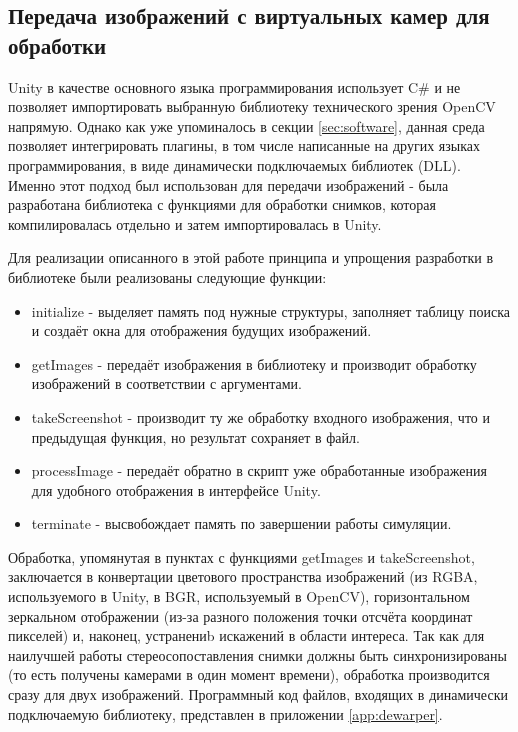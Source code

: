 \subsection{Передача изображений с виртуальных камер для обработки}

Unity в качестве основного языка программирования использует C\# и не позволяет импортировать 
выбранную библиотеку технического зрения OpenCV напрямую. Однако как уже упоминалось в секции 
\ref{sec:software}, данная среда позволяет интегрировать плагины, в том числе написанные на 
других языках программирования, в виде динамически подключаемых библиотек (DLL). Именно этот 
подход был использован для передачи изображений - была разработана библиотека с функциями для 
обработки снимков, которая компилировалась отдельно и затем импортировалась в Unity. 

Для реализации описанного в этой работе принципа и упрощения разработки в библиотеке были реализованы 
следующие функции:
\begin{itemize}
    \item initialize - выделяет память под нужные структуры, заполняет таблицу поиска и создаёт окна 
    для отображения будущих изображений.
    \item getImages - передаёт изображения в библиотеку и производит обработку изображений в 
    соответствии с аргументами. 
    \item takeScreenshot - производит ту же обработку входного изображения, что и предыдущая функция,
     но результат сохраняет в файл. 
    \item processImage - передаёт обратно в скрипт уже обработанные изображения для удобного отображения
    в интерфейсе Unity. 
    \item terminate - высвобождает память по завершении работы симуляции.      
\end{itemize}

Обработка, упомянутая в пунктах с функциями getImages и takeScreenshot, заключается в конвертации 
цветового пространства изображений (из RGBA, используемого в Unity, в BGR, используемый в OpenCV), 
горизонтальном зеркальном отображении (из-за разного положения точки отсчёта координат пикселей)
и, наконец, устранениb искажений в области интереса. Так как для наилучшей работы стереосопоставления
снимки должны быть синхронизированы (то есть получены камерами в один момент времени), обработка        %
производится сразу для двух изображений. Программный код файлов, входящих в динамически                 %
подключаемую библиотеку, представлен в приложении \ref{app:dewarper}.

